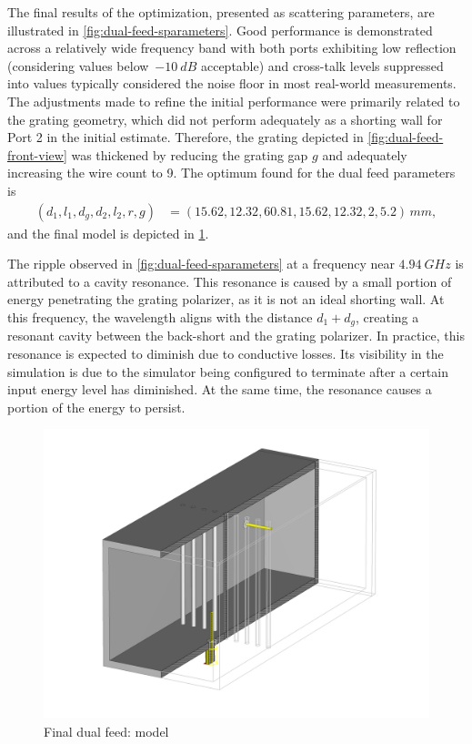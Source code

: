 \documentclass[14pt,a4paper]{ntust_report}
\begin{document}
The final results of the optimization, presented as scattering parameters, are illustrated in \cref{fig:dual-feed-sparameters}. Good performance is demonstrated across a relatively wide frequency band with both ports exhibiting low reflection (considering values below~$-\qty{10}{dB}$ acceptable) and cross-talk levels suppressed into values typically considered the noise floor in most real-world measurements. The adjustments made to refine the initial performance were primarily related to the grating geometry, which did not perform adequately as a shorting wall for Port 2 in the initial estimate. Therefore, the grating depicted in \cref{fig:dual-feed-front-view} was thickened by reducing the grating gap $g$ and adequately increasing the wire count to 9. The optimum found for the dual feed parameters is
\begin{align}
    \label{eq:dual-feed-optimum}
    (d_1,l_1,d_g,d_2,l_2,r,g) &= (15.62,12.32,60.81,15.62,12.32,2,5.2)\,\unit{mm},
\end{align}
and the final model is depicted in \cref{fig:dual-feed-perspective}.

\begin{remark}
    The ripple observed in \cref{fig:dual-feed-sparameters} at a frequency near $\qty{4.94}{GHz}$ is attributed to a cavity resonance. This resonance is caused by a small portion of energy penetrating the grating polarizer, as it is not an ideal shorting wall. At this frequency, the wavelength aligns with the distance $d_1+d_g$, creating a resonant cavity between the back-short and the grating polarizer. In practice, this resonance is expected to diminish due to conductive losses. Its visibility in the simulation is due to the simulator being configured to terminate after a certain input energy level has diminished. At the same time, the resonance causes a portion of the energy to persist.
\end{remark}

\begin{figure}[!ht]
    \centering
    \includegraphics[width=.8\textwidth]{src/dual_feed_perspective.png}
    \caption{\label{fig:dual-feed-perspective}Final dual feed: model}
\end{figure}
\end{document}
